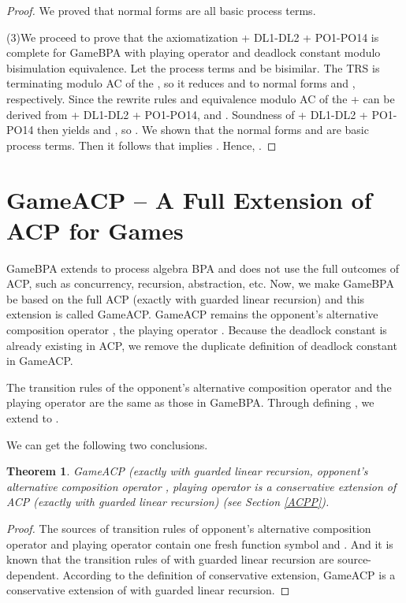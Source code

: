 \documentclass{fac}
\newtheorem{theorem}{Theorem}[section]
\begin{document}
\begin{proof}
We proved that normal forms are all basic process terms.

(3)We proceed to prove that the axiomatization  + DL1-DL2 + PO1-PO14 is complete for GameBPA with playing operator and deadlock constant modulo bisimulation equivalence. Let the process terms  and  be bisimilar. The TRS is terminating modulo AC of the , so it reduces  and  to normal forms  and , respectively. Since the rewrite rules and equivalence modulo AC of the + can be derived from  + DL1-DL2 + PO1-PO14,  and . Soundness of  + DL1-DL2 + PO1-PO14 then yields  and , so . We shown that the normal forms  and  are basic process terms. Then it follows that  implies . Hence, .
\end{proof}

\section{GameACP -- A Full Extension of ACP for Games}

GameBPA extends to process algebra BPA and does not use the full outcomes of ACP, such as concurrency, recursion, abstraction, etc. Now, we make GameBPA be based on the full ACP (exactly  with guarded linear recursion) and this extension is called GameACP. GameACP remains the opponent's alternative composition operator , the playing operator . Because the deadlock constant is already existing in ACP, we remove the duplicate definition of deadlock constant in GameACP.

The transition rules of the opponent's alternative composition operator  and the playing operator  are the same as those in GameBPA. Through defining  , we extend  to .

We can get the following two conclusions.

\begin{theorem}
GameACP (exactly  with guarded linear recursion, opponent's alternative composition operator , playing operator  is a conservative extension of ACP (exactly  with guarded linear recursion) (see Section \ref{ACPP}).
\end{theorem}

\begin{proof}
The sources of transition rules of opponent's alternative composition operator  and playing operator  contain one fresh function symbol  and . And it is known that the transition rules of  with guarded linear recursion are source-dependent. According to the definition of conservative extension, GameACP is a conservative extension of  with guarded linear recursion.
\end{proof}
\end{document}
